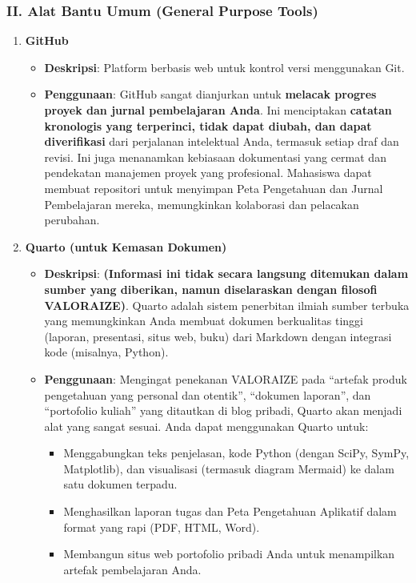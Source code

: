 \documentclass[
  letterpaper,
  DIV=11,
  numbers=noendperiod]{scrreprt}
\providecommand{\tightlist}{%
  \setlength{\itemsep}{0pt}\setlength{\parskip}{0pt}}
\begin{document}
\subsubsection{\texorpdfstring{\textbf{II. Alat Bantu Umum (General
Purpose
Tools)}}{II. Alat Bantu Umum (General Purpose Tools)}}\label{ii.-alat-bantu-umum-general-purpose-tools}

\begin{enumerate}
\def\labelenumi{\arabic{enumi}.}
\item
  \textbf{GitHub}

  \begin{itemize}
  \tightlist
  \item
    \textbf{Deskripsi}: Platform berbasis web untuk kontrol versi
    menggunakan Git.
  \item
    \textbf{Penggunaan}: GitHub sangat dianjurkan untuk \textbf{melacak
    progres proyek dan jurnal pembelajaran Anda}. Ini menciptakan
    \textbf{catatan kronologis yang terperinci, tidak dapat diubah, dan
    dapat diverifikasi} dari perjalanan intelektual Anda, termasuk
    setiap draf dan revisi. Ini juga menanamkan kebiasaan dokumentasi
    yang cermat dan pendekatan manajemen proyek yang profesional.
    Mahasiswa dapat membuat repositori untuk menyimpan Peta Pengetahuan
    dan Jurnal Pembelajaran mereka, memungkinkan kolaborasi dan
    pelacakan perubahan.
  \end{itemize}
\item
  \textbf{Quarto (untuk Kemasan Dokumen)}

  \begin{itemize}
  \tightlist
  \item
    \textbf{Deskripsi}: \textbf{(Informasi ini tidak secara langsung
    ditemukan dalam sumber yang diberikan, namun diselaraskan dengan
    filosofi VALORAIZE)}. Quarto adalah sistem penerbitan ilmiah sumber
    terbuka yang memungkinkan Anda membuat dokumen berkualitas tinggi
    (laporan, presentasi, situs web, buku) dari Markdown dengan
    integrasi kode (misalnya, Python).
  \item
    \textbf{Penggunaan}: Mengingat penekanan VALORAIZE pada ``artefak
    produk pengetahuan yang personal dan otentik'', ``dokumen laporan'',
    dan ``portofolio kuliah'' yang ditautkan di blog pribadi, Quarto
    akan menjadi alat yang sangat sesuai. Anda dapat menggunakan Quarto
    untuk:

    \begin{itemize}
    \tightlist
    \item
      Menggabungkan teks penjelasan, kode Python (dengan SciPy, SymPy,
      Matplotlib), dan visualisasi (termasuk diagram Mermaid) ke dalam
      satu dokumen terpadu.
    \item
      Menghasilkan laporan tugas dan Peta Pengetahuan Aplikatif dalam
      format yang rapi (PDF, HTML, Word).
    \item
      Membangun situs web portofolio pribadi Anda untuk menampilkan
      artefak pembelajaran Anda.
    \end{itemize}
  \end{itemize}
\end{enumerate}
\end{document}
